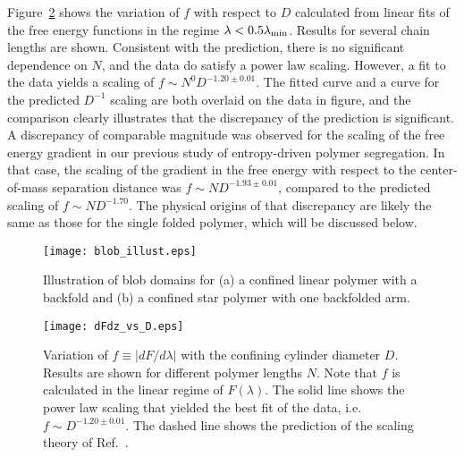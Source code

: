 \documentclass[journal=mamobx,manuscript=article,layout=twocolumn]{achemso}
\begin{document}
Figure~\ref{fig:dFdz_vs_D} shows the variation of $f$ with respect to $D$
calculated from linear fits of the free energy functions in the regime 
$\lambda < 0.5\lambda_{\rm min}$. Results for several chain lengths are shown. 
Consistent with the prediction, there is no significant dependence on $N$,
and the data do satisfy a power law scaling. However, a fit to the data yields
a scaling of $f \sim N^0 D^{-1.20\pm 0.01}$. The fitted curve and a curve for
the predicted $D^{-1}$ scaling are both overlaid on the data in figure, and
the comparison clearly illustrates that the discrepancy of the prediction is significant.
A discrepancy of comparable magnitude was observed for the scaling of the free energy gradient
in our previous study of entropy-driven polymer segregation.\cite{polson2014polymer}
In that case, the scaling of the gradient in the free energy with respect to the 
center-of-mass separation distance was $f\sim N D^{-1.93\pm 0.01}$, compared to the 
predicted scaling of $f \sim N D^{-1.70}$. The physical origins of that discrepancy 
are likely the same as those for the single folded polymer, which will be discussed
below.

\begin{figure}[!ht]
\begin{center}
\vskip 0.1in
\texttt{[image: blob\_illust.eps]}
\end{center}
\caption{Illustration of blob domains for (a) a confined linear polymer with a backfold and
(b) a confined star polymer with one backfolded arm.}
\label{fig:blob_illust}
\end{figure}

\begin{figure}[!ht]
\begin{center}
\texttt{[image: dFdz\_vs\_D.eps]}
\end{center}
\caption{
Variation of $f\equiv |dF/d\lambda|$ with the confining cylinder diameter $D$. Results are 
shown for different polymer lengths $N$.  Note that  $f$ is calculated in the 
linear regime of $F(\lambda)$. The solid line shows the power law scaling that yielded
the best fit of the data, i.e. $f \sim D^{-1.20\pm 0.01}$. The dashed line shows
the prediction of the scaling theory of Ref.~.
}
\label{fig:dFdz_vs_D}
\end{figure}
\end{document}
